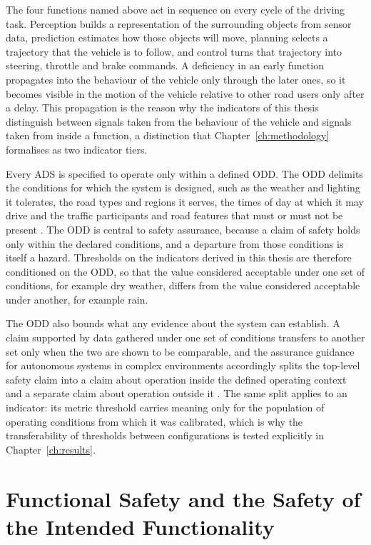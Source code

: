 The four functions named above act in sequence on every cycle of the driving task.
Perception builds a representation of the surrounding objects from sensor data,
prediction estimates how those objects will move, planning selects a trajectory that
the vehicle is to follow, and control turns that trajectory into steering, throttle
and brake commands. A deficiency in an early function propagates into the behaviour of
the vehicle only through the later ones, so it becomes visible in the motion of the
vehicle relative to other road users only after a delay. This propagation is the
reason why the indicators of this thesis distinguish between signals taken from the
behaviour of the vehicle and signals taken from inside a function, a distinction that
Chapter~\ref{ch:methodology} formalises as two indicator tiers.

Every \ac{ADS} is specified to operate only within a defined \ac{ODD}. The \ac{ODD}
delimits the conditions for which the system is designed, such as the weather and
lighting it tolerates, the road types and regions it serves, the times of day at which
it may drive and the traffic participants and road features that must or must not be
present \cite{saej3016}. The \ac{ODD} is central
to safety assurance, because a claim of safety holds only within the declared
conditions, and a departure from those conditions is itself a hazard. Thresholds on
the indicators derived in this thesis are therefore conditioned on the \ac{ODD}, so
that the value considered acceptable under one set of conditions, for example dry
weather, differs from the value considered acceptable under another, for example rain.

The \ac{ODD} also bounds what any evidence about the system can establish. A claim
supported by data gathered under one set of conditions transfers to another set only
when the two are shown to be comparable, and the assurance guidance for autonomous
systems in complex environments accordingly splits the top-level safety claim into a
claim about operation inside the defined operating context and a separate claim about
operation outside it \cite{hawkins2022sace}. The same split applies to an indicator:
its metric threshold carries meaning only for the population of operating conditions
from which it was calibrated, which is why the transferability of thresholds between
configurations is tested explicitly in Chapter~\ref{ch:results}.

\section{Functional Safety and the Safety of the Intended Functionality}
\label{sec:fund_safety}

